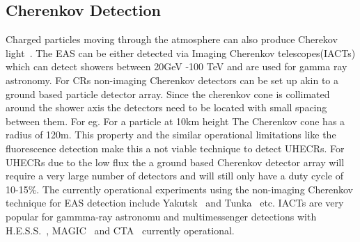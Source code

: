 \subsection*{Cherenkov Detection}
\label{sec:EAS_cher}
Charged particles moving through the atmosphere can also produce Cherekov light~\cite{}. The EAS can be either detected via Imaging Cherenkov telescopes(IACTs) which can detect showers between 20GeV -100 TeV and are used for gamma ray astronomy. For CRs non-imaging Cherenkov detectors can be set up akin to a ground based particle detector array. Since the cherenkov cone is collimated around the shower axis the detectors need to be located with small spacing between them. For eg. For a particle at 10km height The Cherenkov cone has a radius of 120m. This property and the similar operational limitations like the fluorescence detection make this a not viable technique to detect UHECRs. For UHECRs due to the low flux the a ground based Cherenkov detector array will require a very large number of detectors and will still only have a duty cycle of 10-15\%. The currently operational experiments using the non-imaging Cherenkov technique for EAS detection include Yakutsk~\cite{} and Tunka~\cite{} etc. IACTs are very popular for gammma-ray astronomu and multimessenger detections with H.E.S.S.~\cite{}, MAGIC~\cite{} and CTA~\cite{} currently operational. 

